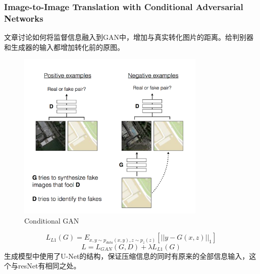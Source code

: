 \documentclass[a4paper]{article}
\begin{document}
\subsubsection{Image-to-Image Translation with Conditional Adversarial Networks\cite{DBLP:journals/corr/IsolaZZE16}}
文章讨论如何将监督信息融入到GAN中，增加与真实转化图片的距离。给判别器和生成器的输入都增加转化前的原图。
\begin{figure}
\centering
\includegraphics[width=0.8\textwidth]{./img/11.png}
\caption{Conditional GAN}
\label{fig:11}
\end{figure}
$$L_{L1}(G) = E_{x,y\sim p_{data}(x,y),z\sim p_z(z)}\left[||y-G(x,z)||_1\right]$$
$$L = L_{GAN}(G,D) + \lambda L_{L1}(G)$$
生成模型中使用了U-Net的结构，保证压缩信息的同时有原来的全部信息输入，这个与resNet有相同之处。
\end{document}

